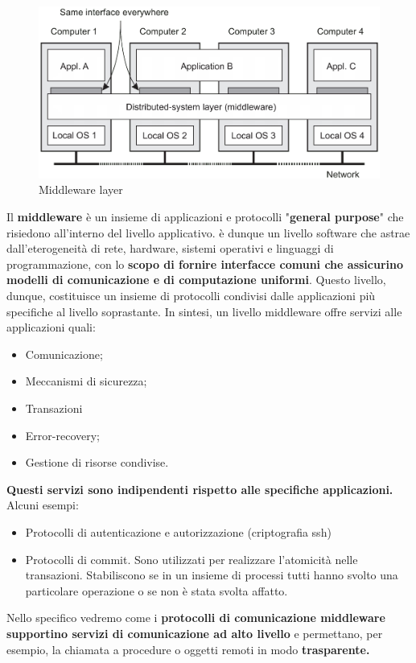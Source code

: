\documentclass[12pt]{article}
\begin{document}
			\begin{figure}[h!]
				\centering
				\includegraphics[scale=0.50]{img/middle.png}
				\caption{Middleware layer}
			\end{figure}
			Il \textbf{middleware} è un insieme di applicazioni e protocolli "\textbf{general purpose}" che risiedono all'interno del livello applicativo. è dunque un livello software che astrae dall'eterogeneità di rete, hardware, sistemi operativi e linguaggi di programmazione, con lo \textbf{scopo di fornire interfacce comuni che assicurino  modelli di comunicazione e di computazione uniformi}.  Questo livello, dunque, costituisce un insieme di protocolli condivisi dalle applicazioni più specifiche al livello soprastante.
			In sintesi, un livello middleware offre servizi alle applicazioni quali:
			\begin{itemize}
				\item Comunicazione;
				\item Meccanismi di sicurezza;
				\item Transazioni
				\item Error-recovery;
				\item Gestione di risorse condivise.
			\end{itemize}
			\textbf{Questi servizi sono indipendenti rispetto alle specifiche applicazioni.} 
			Alcuni esempi:
			\begin{itemize}
				\item Protocolli di autenticazione e autorizzazione (criptografia ssh)
				\item Protocolli di commit. Sono utilizzati per realizzare l'atomicità nelle transazioni. Stabiliscono se in un insieme di processi tutti hanno svolto una particolare operazione o se non è stata svolta affatto.
			\end{itemize}
			Nello specifico vedremo come i \textbf{protocolli di comunicazione middleware supportino servizi di comunicazione ad alto livello} e permettano, per esempio, la chiamata a procedure o oggetti remoti in modo \textbf{trasparente.}
			 
\end{document}
